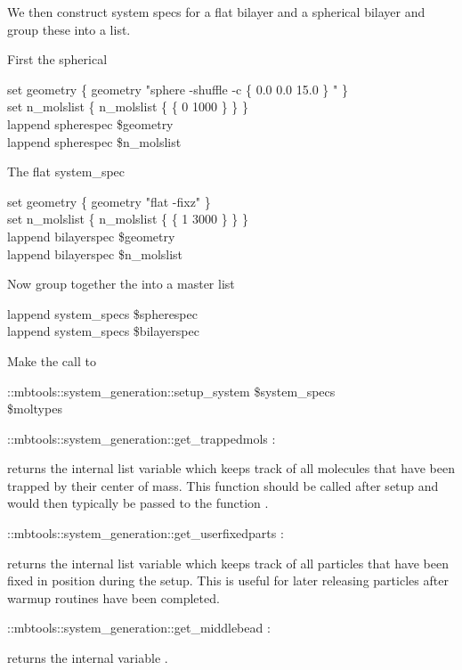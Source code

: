 We then construct system specs for a flat bilayer and a spherical
bilayer and group these into a  list.

First the spherical 

\begin{code}      	   
  set geometry \{ geometry  "sphere -shuffle -c \{ 0.0 0.0 15.0 \} " \}\\
  set n_molslist \{ n_molslist \{  \{ 0 1000 \} \} \}\\
  lappend spherespec \$geometry \\
  lappend spherespec \$n_molslist\\
\end{code}      	  

The flat system_spec

\begin{code}     	  
  set geometry \{ geometry "flat -fixz" \}\\
  set n_molslist \{ n_molslist \{  \{ 1 3000 \} \} \}\\
  lappend bilayerspec \$geometry\\
  lappend bilayerspec \$n_molslist\\
\end{code}      	  
      	

Now group together the  into a master list

\begin{code}      	  
  lappend system_specs \$spherespec\\
  lappend system_specs \$bilayerspec\\
\end{code}   	  


Make the call to 

\begin{code}
  ::mbtools::system_generation::setup_system \$system_specs\\
           [setmd box_l] \$moltypes
\end{code}


\begin{code}
  ::mbtools::system_generation::get_trappedmols : 
\end{code}
returns the internal list variable  which keeps track
of all molecules that have been trapped by their center of mass. This
function should be called after setup and would then typically be
passed to the function .
\begin{code}
  ::mbtools::system_generation::get_userfixedparts : 
\end{code}
returns the internal list variable  which keeps
track of all particles that have been fixed in position during the
setup. This is useful for later releasing particles after warmup
routines have been completed.
\begin{code}
  ::mbtools::system_generation::get_middlebead : 
\end{code}
returns the internal variable .

